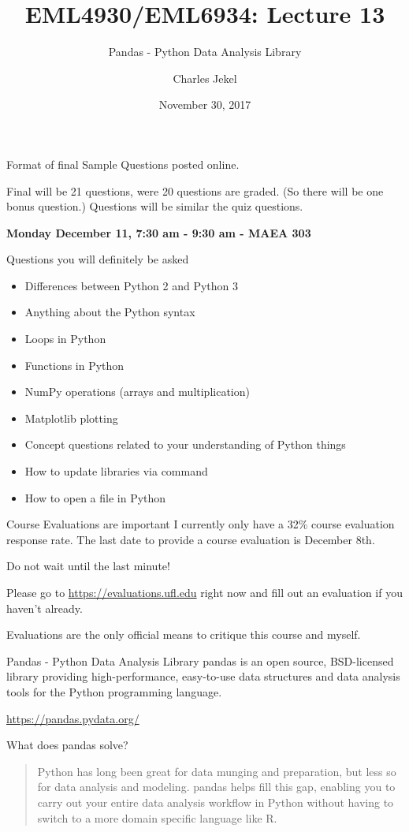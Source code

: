 \documentclass[10pt]{beamer}
\title{EML4930/EML6934: Lecture 13}
\subtitle{Pandas - Python Data Analysis Library}
\date{November 30, 2017}
\author{Charles Jekel}
\begin{document}
\maketitle

\begin{frame}{Format of final}
Sample Questions posted online.

Final will be 21 questions, were 20 questions are graded. (So there will be one bonus question.) Questions will be similar the quiz questions.

\textbf{Monday December 11, 7:30 am - 9:30 am - MAEA 303}
\end{frame}

\begin{frame}{Questions you will definitely be asked}
\begin{itemize}
\item Differences between Python 2 and Python 3
\item Anything about the Python syntax
\item Loops in Python
\item Functions in Python
\item NumPy operations (arrays and multiplication) 
\item Matplotlib plotting
\item Concept questions related to your understanding of Python things
\item How to update libraries via command
\item How to open a file in Python
\end{itemize}
\end{frame}

\begin{frame}{Course Evaluations are important}
I currently only have a 32\% course evaluation response rate. The last date to provide a course evaluation is December 8th. 

Do not wait until the last minute!

Please go to \url{https://evaluations.ufl.edu} right now and fill out an evaluation if you haven't already.  

Evaluations are the only official means to critique this course and myself.
\end{frame}

\begin{frame}{Pandas - Python Data Analysis Library}
pandas is an open source, BSD-licensed library providing high-performance, easy-to-use data structures and data analysis tools for the Python programming language.

\url{https://pandas.pydata.org/}

What does pandas solve?
  \begin{quote}
    Python has long been great for data munging and preparation, but less so for data analysis and modeling. pandas helps fill this gap, enabling you to carry out your entire data analysis workflow in Python without having to switch to a more domain specific language like R.
\end{quote}

\end{frame}
\end{document}
